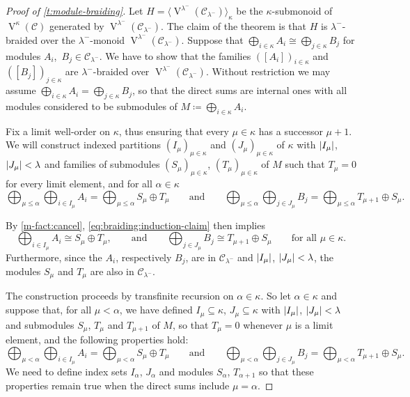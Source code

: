 \documentclass[a4paper,11pt,oneside]{amsart}
\theoremstyle{remark}
\DeclarePairedDelimiter{\card}{\lvert}{\rvert}
\newcommand{\cC}{\mathcal C}
\DeclareMathOperator{\Vmon}{V}
\begin{document}
\begin{proof}[Proof of \cref{t:module-braiding}]
  Let $H=\big\langle \Vmon^{\lambda^-}(\cC_{\lambda^-}) \big\rangle_{\kappa}$ be the $\kappa$-submonoid of $\Vmon^{\kappa}(\cC)$ generated by $\Vmon^{\lambda^-}(\cC_{\lambda^-})$.
  The claim of the theorem is that $H$ is $\lambda^-$-braided over the $\lambda^-$-monoid $\Vmon^{\lambda^-}(\cC_{\lambda^-})$.
  Suppose that $\bigoplus_{i \in \kappa} A_i \cong \bigoplus_{j \in \kappa} B_j$ for modules $A_i$,~$B_j \in \cC_{\lambda^-}$.
  We have to show that the families $([A_i])_{i \in \kappa}$ and $([B_j])_{j \in \kappa}$ are $\lambda^-$-braided over $\Vmon^{\lambda^-}(\cC_{\lambda^-})$.
  Without restriction we may assume $\bigoplus_{i \in \kappa} A_i = \bigoplus_{j \in \kappa} B_j$, so that the direct sums are internal ones with all modules considered to be submodules of $M\coloneqq \bigoplus_{i \in \kappa} A_i$.

  Fix a limit well-order on $\kappa$, thus ensuring that every $\mu \in \kappa$ has a successor $\mu+1$.
  We will construct indexed partitions $(I_\mu)_{\mu \in \kappa}$ and $(J_\mu)_{\mu \in \kappa}$ of $\kappa$ with $\card{I_\mu}$, $\card{J_\mu} < \lambda$ and families of submodules $(S_\mu)_{\mu \in \kappa}$, $(T_\mu)_{\mu \in \kappa}$ of $M$ such that $T_\mu=0$ for every limit element, and for all $\alpha \in \kappa$
  \begin{equation} \label{eq:braiding:induction-claim}
    \bigoplus_{\mu \le \alpha} \bigoplus_{i \in I_\mu} A_i = \bigoplus_{\mu \le \alpha} S_\mu \oplus T_\mu
    \qquad\text{and}\qquad
    \bigoplus_{\mu \le \alpha} \bigoplus_{j \in J_\mu} B_j = \bigoplus_{\mu \le \alpha} T_{\mu +1} \oplus S_\mu.
  \end{equation}
  
  By \ref{m-fact:cancel}, \cref{eq:braiding:induction-claim} then implies
  \[
    \bigoplus_{i \in I_\mu} A_i \cong S_\mu \oplus T_\mu,
    \qquad\text{and}\qquad
    \bigoplus_{j \in J_\mu} B_j \cong T_{\mu+1} \oplus  S_{\mu} \qquad \text{for all } \mu \in \kappa.
  \]
  Furthermore, since the $A_i$, respectively $B_j$, are in $\cC_{\lambda^-}$ and $\card{I_\mu}$, $\card{J_\mu} < \lambda$, the modules $S_\mu$ and $T_\mu$ are also in $\cC_{\lambda^-}$.

  The construction proceeds by transfinite recursion on $\alpha \in \kappa$.
  So let $\alpha \in \kappa$ and suppose that, for all $\mu < \alpha$, we have defined $I_\mu \subseteq \kappa$, $J_\mu \subseteq \kappa$ with $\card{I_\mu}$, $\card{J_\mu} < \lambda$ and submodules $S_\mu$, $T_\mu$ and $T_{\mu+1}$ of $M$, so that $T_\mu=0$ whenever $\mu$ is a limit element, and the following properties hold:
  \begin{equation} \label{eq:braiding:induction-hypothesis}
    \bigoplus_{\mu < \alpha} \bigoplus_{i \in I_\mu} A_i = \bigoplus_{\mu < \alpha} S_\mu \oplus T_\mu
    \qquad\text{and}\qquad
    \bigoplus_{\mu < \alpha} \bigoplus_{j \in J_\mu} B_j = \bigoplus_{\mu < \alpha} T_{\mu +1} \oplus S_\mu.
  \end{equation}
  We need to define index sets $I_\alpha$, $J_\alpha$ and modules $S_\alpha$, $T_{\alpha+1}$ so that these properties remain true when the direct sums include $\mu=\alpha$.


\end{proof}
\end{document}
